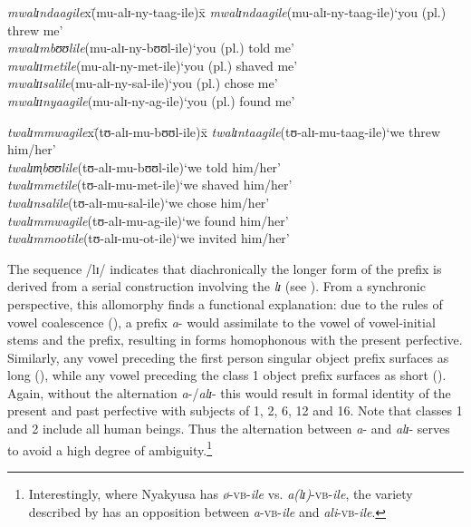\pagebreak
\begin{exe}
\ex\label{exPSTPFValiOM1SG}
\begin{tabbing}
\textit{mwalɪndaagile}x\=(\degree mu-alɪ-ny-taag-ile)x\=\kill
\textit{mwalɪndaagile}\>(\degree mu-alɪ-ny-taag-ile)\>`you (pl.) threw me'\\
\textit{mwalɪmbʊʊlile}\>(\degree mu-alɪ-ny-bʊʊl-ile)\>`you (pl.) told me'\\
\textit{mwalɪɪmetile}\>(\degree mu-alɪ-ny-met-ile)\>`you (pl.) shaved me'\\
\textit{mwalɪɪsalile}\>(\degree mu-alɪ-ny-sal-ile)\>`you (pl.) chose me'\\
\textit{mwalɪɪnyaagile}\>(\degree mu-alɪ-ny-ag-ile)\>`you (pl.) found me'
\end{tabbing}
\ex\label{exPSTPFValiOMNCL1}
\begin{tabbing}
\textit{twalɪmmwagile}x\=(\degree tʊ-alɪ-mu-bʊʊl-ile)x\=\kill%
\textit{twalɪntaagile}\>(\degree tʊ-alɪ-mu-taag-ile)\>`we threw him/her'\\
\textit{twalɪm̩bʊʊlile}\>(\degree tʊ-alɪ-mu-bʊʊl-ile)\>`we told him/her'\\
\textit{twalɪmmetile}\>(\degree tʊ-alɪ-mu-met-ile)\>`we shaved him/her'\\
\textit{twalɪnsalile}\>(\degree tʊ-alɪ-mu-sal-ile)\>`we chose him/her'\\
\textit{twalɪmmwagile}\>(\degree tʊ-alɪ-mu-ag-ile)\>`we found him/her'\\ 
\textit{twalɪmmootile}\>(\degree tʊ-alɪ-mu-ot-ile)\>`we invited him/her'
\end{tabbing}
\end{exe}

The sequence /lɪ/ indicates that diachronically the longer form of the prefix is derived from a serial construction involving the  \textit{lɪ} (see \citealt{BotneR1986}). From a synchronic perspective, this allomorphy finds a functional explanation: due to the rules of vowel coalescence (), a prefix \textit{a}- would assimilate to the vowel of vowel-initial stems and the  prefix, resulting in forms homophonous with the present perfective. Similarly, any vowel preceding the first person singular object prefix surfaces as long (), while any vowel preceding the class 1 object prefix surfaces as short (). Again, without the alternation \textit{a}-/\textit{alɪ}- this would result in formal identity of the present and past perfective with subjects of  1, 2, 6, 12 and 16. Note that classes 1 and 2 include all human beings. Thus the alternation between \textit{a}- and \textit{alɪ}- serves to avoid a high degree of ambiguity.\footnote{Interestingly, where Nyakyusa has \textit{ø}-\textsc{vb}-\textit{ile} vs. \textit{a(lɪ)}-\textsc{vb}-\textit{ile}, the  variety described by \citet[76f]{KishindoP1999} has an opposition between \textit{a}-\textsc{vb}-\textit{ile} and \textit{ali}-\textsc{vb}-\textit{ile}.}

